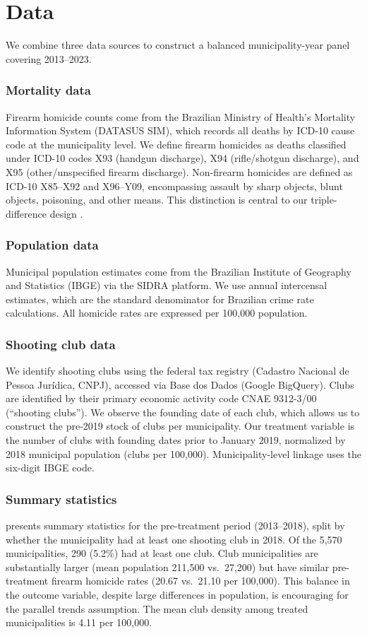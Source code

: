 \documentclass[12pt]{article}
\begin{document}
\section{Data}
\label{sec:data}

We combine three data sources to construct a balanced municipality-year panel covering 2013--2023.

\subsubsection*{Mortality data} Firearm homicide counts come from the Brazilian Ministry of Health's Mortality Information System (DATASUS SIM), which records all deaths by ICD-10 cause code at the municipality level. We define firearm homicides as deaths classified under ICD-10 codes X93 (handgun discharge), X94 (rifle/shotgun discharge), and X95 (other/unspecified firearm discharge). Non-firearm homicides are defined as ICD-10 X85--X92 and X96--Y09, encompassing assault by sharp objects, blunt objects, poisoning, and other means. This distinction is central to our triple-difference design \citep{cerqueira2017atlas}.

\subsubsection*{Population data} Municipal population estimates come from the Brazilian Institute of Geography and Statistics (IBGE) via the SIDRA platform. We use annual intercensal estimates, which are the standard denominator for Brazilian crime rate calculations. All homicide rates are expressed per 100,000 population.

\subsubsection*{Shooting club data} We identify shooting clubs using the federal tax registry (Cadastro Nacional de Pessoa Jur\'{i}dica, CNPJ), accessed via Base dos Dados (Google BigQuery). Clubs are identified by their primary economic activity code CNAE 9312-3/00 (``shooting clubs''). We observe the founding date of each club, which allows us to construct the pre-2019 stock of clubs per municipality. Our treatment variable is the number of clubs with founding dates prior to January 2019, normalized by 2018 municipal population (clubs per 100,000). Municipality-level linkage uses the six-digit IBGE code.

\subsubsection*{Summary statistics}  presents summary statistics for the pre-treatment period (2013--2018), split by whether the municipality had at least one shooting club in 2018. Of the 5,570 municipalities, 290 (5.2\%) had at least one club. Club municipalities are substantially larger (mean population 211,500 vs.\ 27,200) but have similar pre-treatment firearm homicide rates (20.67 vs.\ 21.10 per 100,000). This balance in the outcome variable, despite large differences in population, is encouraging for the parallel trends assumption. The mean club density among treated municipalities is 4.11 per 100,000.
\end{document}
